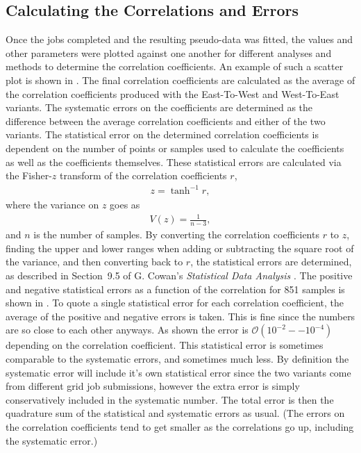 \subsection{Calculating the Correlations and Errors}


Once the jobs completed and the resulting pseudo-data was fitted, the \R values and other parameters were plotted against one another for different analyses and methods to determine the correlation coefficients. An example of such a scatter plot is shown in . The final correlation coefficients are calculated as the average of the correlation coefficients produced with the East-To-West and West-To-East variants. The systematic errors on the coefficients are determined as the difference between the average correlation coefficients and either of the two variants. The statistical error on the determined correlation coefficients is dependent on the number of points or samples used to calculate the coefficients as well as the coefficients themselves. These statistical errors are calculated via the Fisher-$z$ transform of the correlation coefficients $r$,
\begin{align}
    z = \tanh^{-1}r,
\end{align}
where the variance on $z$ goes as
\begin{align}
    V(z) = \frac{1}{n-3},
\end{align}
and $n$ is the number of samples. By converting the correlation coefficients $r$ to $z$, finding the upper and lower ranges when adding or subtracting the square root of the variance, and then converting back to $r$, the statistical errors are determined, as described in Section~9.5 of G. Cowan's \textit{Statistical Data Analysis} \cite{Cowan}. The positive and negative statistical errors as a function of the correlation for 851 samples is shown in . To quote a single statistical error for each correlation coefficient, the average of the positive and negative errors is taken. This is fine since the numbers are so close to each other anyways. As shown the error is $\mathcal{O}(10^{-2}--10^{-4})$ depending on the correlation coefficient. This statistical error is sometimes comparable to the systematic errors, and sometimes much less. By definition the systematic error will include it's own statistical error since the two variants come from different grid job submissions, however the extra error is simply conservatively included in the systematic number. The total error is then the quadrature sum of the statistical and systematic errors as usual. (The errors on the correlation coefficients tend to get smaller as the correlations go up, including the systematic error.)





